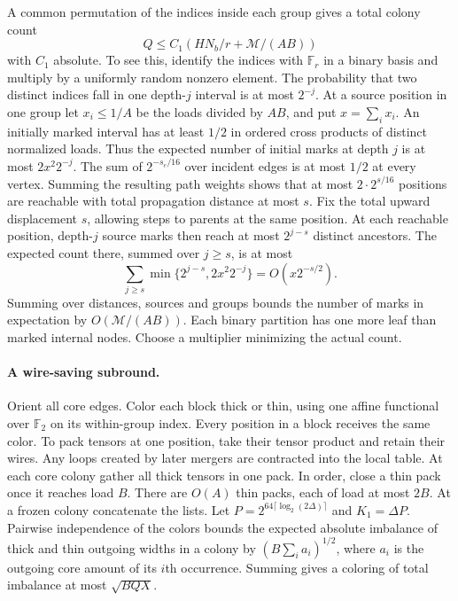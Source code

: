A common permutation of the indices inside each group gives a total colony count
\begin{equation}
 Q\le C_1\left( HN_b/r+\mathcal M/(AB)\right)
 \label{eq:core-colonies}
\end{equation}
with \(C_1\) absolute. To see this, identify the indices with \(\mathbb F_r\) in a binary basis and multiply by a uniformly random nonzero element. The probability that two distinct indices fall in one depth-\(j\) interval is at most \(2^{-j}\). At a source position in one group let \(x_i\le1/A\) be the loads divided by \(AB\), and put \(x=\sum_i x_i\). An initially marked interval has at least \(1/2\) in ordered cross products of distinct normalized loads. Thus the expected number of initial marks at depth \(j\) is at most \(2x^2 2^{-j}\). The sum of \(2^{-s_e/16}\) over incident edges is at most \(1/2\) at every vertex. Summing the resulting path weights shows that at most \(2\cdot2^{s/16}\) positions are reachable with total propagation distance at most \(s\). Fix the total upward displacement \(s\), allowing steps to parents at the same position. At each reachable position, depth-\(j\) source marks then reach at most \(2^{j-s}\) distinct ancestors. The expected count there, summed over \(j\ge s\), is at most
\[
 \sum_{j\ge s}\min\{2^{j-s},2x^2 2^{-j}\}=O(x2^{-s/2}).
\]
Summing over distances, sources and groups bounds the number of marks in expectation by \(O(\mathcal M/(AB))\). Each binary partition has one more leaf than marked internal nodes. Choose a multiplier minimizing the actual count.

\paragraph{A wire-saving subround.}
Orient all core edges. Color each block thick or thin, using one affine
functional over \(\mathbb F_2\) on its within-group index. Every position
in a block receives the same color. To pack tensors at one position,
take their tensor product and retain their wires. Any loops created by
later mergers are contracted into the local table. At each core colony gather all thick tensors in one pack. In order, close a thin pack once it reaches load \(B\). There are \(O(A)\) thin packs, each of load at most \(2B\). At a frozen colony concatenate the lists. Let
\(P=2^{64\lceil\log_2(2\Delta)\rceil}\) and \(K_1=\Delta P\).
Pairwise independence of the colors bounds the expected absolute imbalance of thick and thin outgoing widths in a colony by \((B\sum_i a_i)^{1/2}\), where \(a_i\) is the outgoing core amount of its \(i\)th occurrence. Summing gives a coloring of total imbalance at most \(\sqrt{BQX}\).

